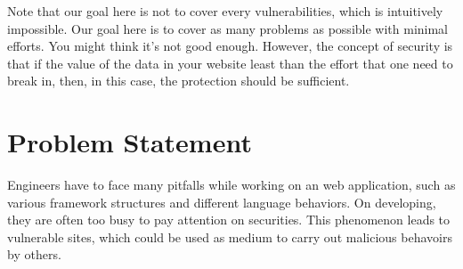 \documentclass[conference]{IEEEtran}
\begin{document}
Note that our goal here is not to cover every vulnerabilities, which is intuitively impossible.
Our goal here is to cover as many problems as possible with minimal efforts.
You might think it's not good enough.
However, the concept of security is that if the value of the data in your website
least than the effort that one need to break in, then, in this case,
the protection should be sufficient.
%
%
%
%
%

\section{Problem Statement}
Engineers have to face many pitfalls while working on an web application, such as
various framework structures and different language behaviors.
On developing,
they are often too busy to pay attention on securities.
This phenomenon leads to vulnerable sites,
which could be used as medium to carry out malicious behavoirs by others.
\end{document}
